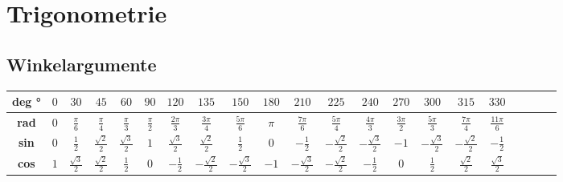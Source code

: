 \section{Trigonometrie}
\subsection{Winkelargumente}
\renewcommand{\arraystretch}{1.5}
\begin{tabular}{|c|c|c|c|c|c|c|c|c|c|c|c|c|c|c|c|c|c|c|c|c|}
	\hline \textbf{deg °} & $0$& $30$& $45$& $60$ &$90$&$120$& $135$&$150$&$180$ &$210$&$225$&$240$&$270$&$300$&$315$&$330$\\
	\hline \textbf{rad} & $0$& $\frac{\pi}{6}$&$\frac{\pi}{4}$&$\frac{\pi}{3}$&$\frac{\pi}{2}$&$\frac{2\pi}{3}$&$\frac{3\pi}{4}$&$\frac{5\pi}{6}$ &$\pi$&$\frac{7\pi}{6}$&$\frac{5\pi}{4}$&$\frac{4\pi}{3}$&$\frac{3\pi}{2}$&$\frac{5\pi}{3}$&$\frac{7\pi}{4}$&$\frac{11\pi}{6}$\\ 
	\hline \textbf{sin}&$0$&$\frac{1}{2}$&$\frac{\sqrt{2}}{2}$&$\frac{\sqrt{3}}{2}$&$1$&$\frac{\sqrt{3}}{2}$& $\frac{\sqrt{2}}{2}$&	$\frac{1}{2}$&$0$&$-\frac{1}{2}$ &$-\frac{\sqrt{2}}{2}$ &$-\frac{\sqrt{3}}{2}$ &$-1$&$-\frac{\sqrt{3}}{2}$ &$-\frac{\sqrt{2}}{2}$&$-\frac{1}{2}$\\
	\hline \textbf{cos}&$1$&$\frac{\sqrt{3}}{2}$ &$\frac{\sqrt{2}}{2}$&$\frac{1}{2}$ &$0$&$-\frac{1}{2}$&$-\frac{\sqrt{2}}{2}$&$-\frac{\sqrt{3}}{2}$&$-1$&$-\frac{\sqrt{3}}{2}$&$-\frac{\sqrt{2}}{2}$& $-\frac{1}{2}$&$0$&$\frac{1}{2}$&$\frac{\sqrt{2}}{2}$&$\frac{\sqrt{3}}{2}$\\
	\hline
\end{tabular}

